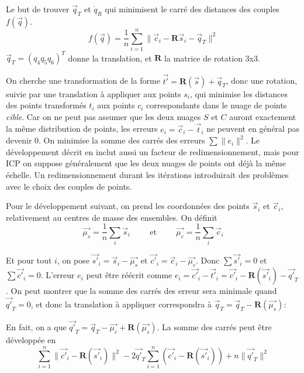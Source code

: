 \documentclass[a4paper,10pt]{scrreprt}
\begin{document}
Le but de trouver $\vec{q}_T$ et $\dot{q}_R$ qui minimisent le carré des distances des couples $f(\vec{q})$.
\begin{equation}
	f(\vec{q}) = \frac{1}{n} \sum_{i=1}^{n} \| \vec{c}_i - \mathbf{R} \vec{s}_i - \vec{q}_T \|^2
\end{equation}
$\vec{q}_T = (q_4 q_5 q_6)^T$ donne la translation, et $\mathbf{R}$ la matrice de rotation 3x3.

On cherche une transformation de la forme $\vec{t'} = \mathbf{R}(\vec{s}) + \vec{q}_T$, donc une rotation, suivie par une translation à appliquer aux points $s_i$, qui minimise les distances des points transformés $t_i$ aux points $c_i$ correspondants dans le nuage de points \emph{cible}. Car on ne peut pas assumer que les deux nuages $S$ et $C$ auront exactement la même distribution de points, les erreurs $e_i = \vec{c}_i - \vec{t}_i$ ne peuvent en général pas devenir $0$. On minimise la somme des carrés des erreurs $\sum \| e_i \|^2$. Le développement décrit en \cite{Horn1986} inclut aussi un facteur de redimensionnement, mais pour ICP on suppose généralement que les deux nuages de points ont déjà la même échelle. Un redimensionnement durant les itérations introduirait des problèmes avec le choix des couples de points.

Pour le développement suivant, on prend les coordonnées des points $\vec{s}_i$ et $\vec{c}_i$, relativement au centres de masse des ensembles. On définit
\begin{equation}
	\vec{\mu_s} = \frac{1}{n} \sum_{i} \vec{s}_i
	\hspace{1cm} \text{et} \hspace{1cm}
	\vec{\mu_c} = \frac{1}{n} \sum_{i} \vec{c}_i
\end{equation}

Et pour tout $i$, on pose $\vec{s'}_i = \vec{s}_i - \vec{\mu_s}$ et $\vec{c'}_i = \vec{c}_i - \vec{\mu_c}$. Donc $\sum \vec{s'}_i = 0$ et $\sum \vec{c'}_i = 0$. L'erreur $e_i$ peut être réécrit comme $e_i = \vec{c'}_i - \vec{t'}_i = \vec{c'}_i - \mathbf{R}(\vec{s'}_i) - \vec{q'}_T$. On peut montrer que la somme des carrés des erreur sera minimale quand $\vec{q'}_T = 0$, et donc la translation à appliquer correspondra à $\vec{q}_T = \vec{q}_T - \mathbf{R}(\vec{\mu_s})$:

En fait, on a que $\vec{q'}_T = \vec{q}_T - \vec{\mu_c} + \mathbf{R}(\vec{\mu_s})$. La somme des carrés peut être développée en
\begin{equation}
	\sum_{i=1}^{n} \| \vec{c'}_i - \mathbf{R}(\vec{s'}_i) \|^2 - 2 \vec{q'}_T \sum_{i=1}^{n} (\vec{c'}_i - \mathbf{R}(\vec{s'}_i)) + n \|\vec{q'}_T\|^2
\end{equation}
\end{document}

